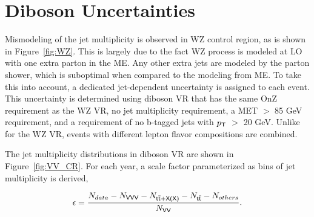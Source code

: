 \section{Diboson Uncertainties}
\label{sec:DiUnc}

Mismodeling of the jet multiplicity is observed in WZ control region, as is shown in Figure~\ref{fig:WZ}. This is largely due to the fact WZ process is modeled at \ac{LO} with one extra parton in the \ac{ME}. Any other extra jets are modeled by the parton shower, which is suboptimal when compared to the modeling from \ac{ME}. To take this into account, a dedicated jet-dependent uncertainty is assigned to each event. This uncertainty is determined using diboson \ac{VR} that has the same OnZ requirement as the WZ \ac{VR}, no jet multiplicity requirement, a MET $>$ 85 GeV requirement, and a requirement of no b-tagged jets with $p_{\textsf{T}}$ $>$ 20 GeV. Unlike for the WZ \ac{VR}, events with different lepton flavor compositions are combined.

The jet multiplicity distributions in diboson \ac{VR} are shown in Figure~\ref{fig:VV_CR}. For each year, a scale factor parameterized as bins of jet multiplicity is derived,

\begin{equation}
\epsilon=\frac{N_{data}-N_{\textsf{VVV}}-N_{\textsf{t}\overline{\textsf{t}}+\textsf{X(X)}}-N_{\textsf{t}\overline{\textsf{t}}}-N_{others}}{N_{\textsf{VV}}}.
\end{equation}

